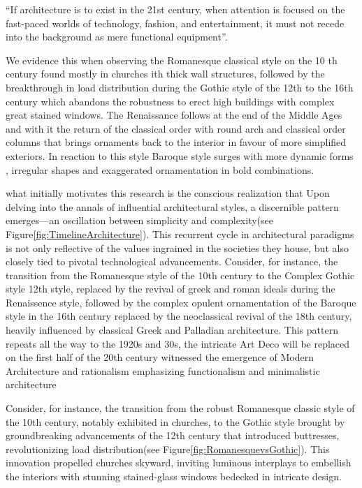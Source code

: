  ``If architecture is to exist in the 21st century, when attention is focused on the fast-paced worlds of technology, fashion, and entertainment, it must not recede into the background as mere functional equipment''\cite{Gage2015}.

We evidence this when observing the Romanesque classical style on the 10 th century found mostly in churches ith thick wall structures, followed by the breakthrough in load distribution during the Gothic style of the 12th to the 16th century which abandons the robustness to erect high buildings with complex great stained windows.
The Renaissance follows at the end of the Middle Ages and with it the return of the classical order with round arch and classical order columns that brings ornaments back to the interior in favour of more simplified exteriors.
In reaction to this style Baroque style surges with more dynamic forms , irregular shapes and exaggerated ornamentation in bold combinations.

what initially motivates this research is the conscious realization that
Upon delving into the annals of influential architectural styles, a discernible pattern emerges—an oscillation between simplicity and complexity(see Figure\ref{fig:TimelineArchitecture}).
This recurrent cycle in architectural paradigms is not only reflective of the values ingrained in the societies they house, but also closely tied to pivotal technological advancements.
Consider, for instance, the transition from the Romanesque style of the 10th century to the Complex Gothic style 12th style, replaced by the revival of greek and roman ideals during the Renaissence style, followed by the complex opulent ornamentation of the Baroque style in the 16th century replaced by the neoclassical revival of the 18th century, heavily influenced by classical Greek and Palladian architecture\cite{Arora2023}.
This pattern repeats all the way to the 1920s and 30s, the intricate Art Deco will be replaced on the first half of the 20th century witnessed the emergence of Modern Architecture and rationalism emphasizing functionalism and minimalistic architecture


Consider, for instance, the transition from the robust Romanesque classic style of the 10th century, notably exhibited in churches, to the Gothic style brought by groundbreaking advancements of the 12th century that introduced buttresses, revolutionizing load distribution\cite{Arora2023}(see Figure\ref{fig:RomanesquevsGothic}).
This innovation propelled churches skyward, inviting luminous interplays to embellish the interiors with stunning stained-glass windows bedecked in intricate design\cite{Stacbond2020}.


